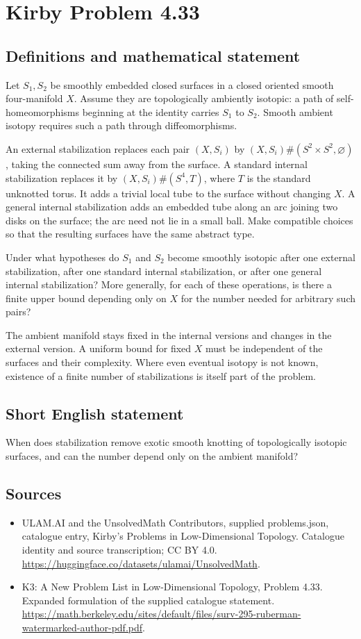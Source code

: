 \documentclass[11pt,a4paper]{article}
\begin{document}
\section*{Kirby Problem 4.33}\label{statement}

\subsection{Definitions and mathematical statement}
Let $S_1,S_2$ be smoothly embedded closed surfaces in a closed oriented smooth four-manifold $X$. Assume they are topologically ambiently isotopic: a path of self-homeomorphisms beginning at the identity carries $S_1$ to $S_2$. Smooth ambient isotopy requires such a path through diffeomorphisms.

An external stabilization replaces each pair $(X,S_i)$ by $(X,S_i)\#(S^2\times S^2,\varnothing)$, taking the connected sum away from the surface. A standard internal stabilization replaces it by $(X,S_i)\#(S^4,T)$, where $T$ is the standard unknotted torus. It adds a trivial local tube to the surface without changing $X$. A general internal stabilization adds an embedded tube along an arc joining two disks on the surface; the arc need not lie in a small ball. Make compatible choices so that the resulting surfaces have the same abstract type.

Under what hypotheses do $S_1$ and $S_2$ become smoothly isotopic after one external stabilization, after one standard internal stabilization, or after one general internal stabilization? More generally, for each of these operations, is there a finite upper bound depending only on $X$ for the number needed for arbitrary such pairs?

The ambient manifold stays fixed in the internal versions and changes in the external version. A uniform bound for fixed $X$ must be independent of the surfaces and their complexity. Where even eventual isotopy is not known, existence of a finite number of stabilizations is itself part of the problem.
\subsection{Short English statement}
When does stabilization remove exotic smooth knotting of topologically isotopic surfaces, and can the number depend only on the ambient manifold?
\subsection{Sources}
\begin{itemize}
\item[S1] ULAM.AI and the UnsolvedMath Contributors, supplied problems.json, catalogue entry, Kirby's Problems in Low-Dimensional Topology. Catalogue identity and source transcription; CC BY 4.0.
\url{https://huggingface.co/datasets/ulamai/UnsolvedMath}.
\item[S2] K3: A New Problem List in Low-Dimensional Topology, Problem 4.33. Expanded formulation of the supplied catalogue statement.
\url{https://math.berkeley.edu/sites/default/files/surv-295-ruberman-watermarked-author-pdf.pdf}.
\end{itemize}
\end{document}
